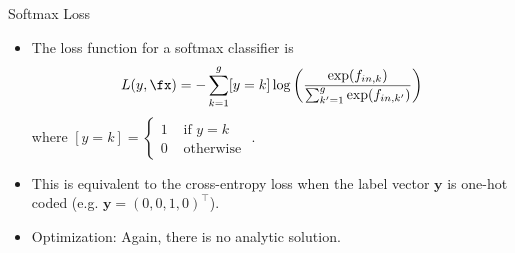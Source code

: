 \begin{frame} {Softmax Loss}
  \begin{itemize}
    \vspace{5mm}
    \item The loss function for a softmax classifier is
    $$L(y, \fx) = - \sum_{k = 1}^g [y = k] \log \left( \frac{\exp(f_{in,k})}{\sum_{k'=1}^g\exp(f_{in,k'})}\right)$$
      where $[y = k] = \begin{cases} 1 & \text{ if } y = k \\
      0 & \text{ otherwise }
      \end{cases}$. 
    \vspace{5mm}
    \item This is equivalent to the cross-entropy loss when the label vector $\bm{y}$ is one-hot coded (e.g. $\mathbf{y} = (0,0,1,0)^\top$). 
    \item Optimization:  Again, there is no analytic solution. %
  \end{itemize}
\end{frame}



